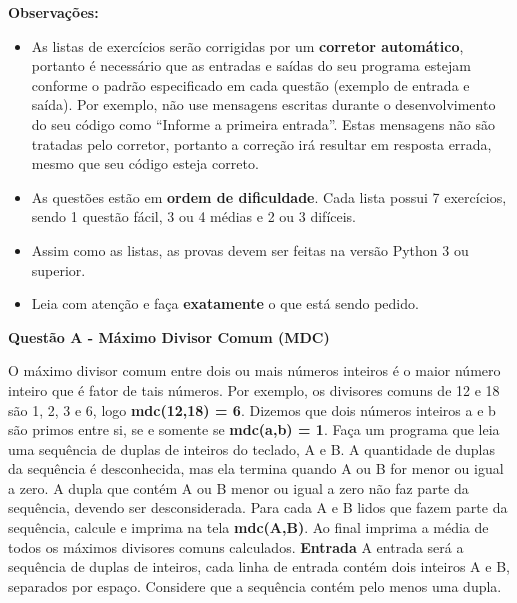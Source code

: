 \documentclass[a4paper, 12pt]{article}
\begin{document}
\textbf{{\large Observações:}}
\begin{itemize}
	\item As listas de exercícios serão corrigidas por um \textbf{corretor automático}, portanto é necessário que as entradas e saídas do seu programa estejam conforme o padrão especificado em cada questão (exemplo de entrada e saída). Por exemplo, não use mensagens escritas durante o desenvolvimento do seu código como “Informe a primeira entrada”. Estas mensagens não são tratadas pelo corretor, portanto a correção irá resultar em resposta errada, mesmo que seu código esteja correto.
	\item As questões estão em \textbf{ordem de dificuldade}. Cada lista possui 7 exercícios, sendo 1 questão fácil, 3 ou 4 médias e 2 ou 3 difíceis.
	\item Assim como as listas, as provas devem ser feitas na versão Python 3 ou superior.
	\item Leia com atenção e faça \textbf{exatamente} o que está sendo pedido.
\end{itemize}
\newpage %
\begin{center}
\textbf{{\Large Questão A - Máximo Divisor Comum (MDC)}}
\end{center}
\vspace{5pt}
O máximo divisor comum entre dois ou mais números inteiros é o maior número inteiro que é fator de tais números. Por exemplo, os divisores comuns de 12 e 18 são 1, 2, 3 e 6, logo\textbf{ mdc(12,18) = 6}. Dizemos que dois números inteiros a e b são primos entre si, se e somente se \textbf{mdc(a,b) = 1}.
\newline
\newline
Faça um programa que leia uma sequência de duplas de inteiros do teclado, A e B. A quantidade de duplas da sequência é desconhecida, mas ela termina quando A ou B for menor ou igual a zero. A dupla que contém A ou B menor ou igual a zero não faz parte da sequência, devendo ser desconsiderada. Para cada A e B lidos que fazem parte da sequência, calcule e imprima na tela \textbf{mdc(A,B)}. Ao final imprima a média de todos os máximos divisores comuns calculados.
\newline \newline
\textbf{{\large Entrada}} \newline
A entrada será a sequência de duplas de inteiros, cada linha de entrada contém dois inteiros A e B, separados por espaço. Considere que a sequência contém pelo menos uma dupla.
\newline \newline
\end{document}
